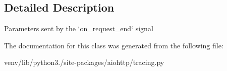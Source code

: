 \subsection{Detailed Description}
\begin{DoxyVerb}Parameters sent by the `on_request_end` signal\end{DoxyVerb}
 

The documentation for this class was generated from the following file\+:\begin{DoxyCompactItemize}
\item 
venv/lib/python3./site-\/packages/aiohttp/tracing.\+py\end{DoxyCompactItemize}
